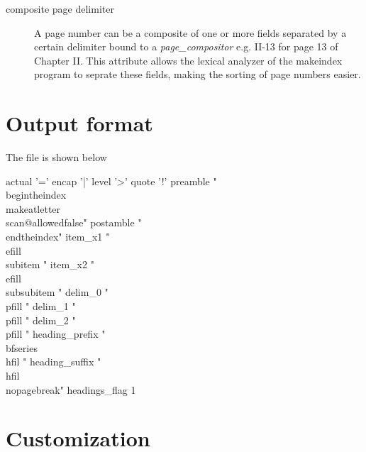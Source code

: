 \begin{description}

\item[composite page delimiter] A page number can be a composite of one or more fields separated by a certain delimiter bound to a \textit{page\_compositor}  e.g. II-13 for page 13 of Chapter II. This attribute allows the lexical analyzer of the makeindex program to seprate these fields, making the sorting of page numbers easier.
\end{description}


\section{Output format}



The file  is shown below
\begin{teXXX}
actual '='
encap '|'
level '>'
quote '!'
preamble
"\n \\begin{theindex} \n \\makeatletter\\scan@allowedfalse\n"
postamble
"\n\n \\end{theindex}\n"
item_x1   "\\efill \n \\subitem "
item_x2   "\\efill \n \\subsubitem "
delim_0   "\\pfill "
delim_1   "\\pfill "
delim_2   "\\pfill "
heading_prefix   "{\\bfseries\\hfil "
heading_suffix   "\\hfil}\\nopagebreak\n"
headings_flag       1
\end{teXXX}


\section{Customization}


